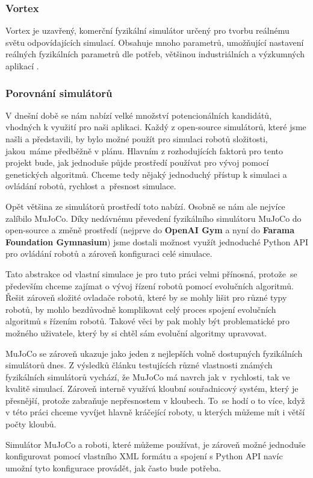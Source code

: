 \subsubsection{Vortex} \label{Vortex}
Vortex je uzavřený, komerční fyzikální simulátor určený pro tvorbu
reálnému světu odpovídajících simulací. Obsahuje mnoho parametrů,
umožňující nastavení reálných fyzikálních parametrů dle potřeb,
většinou industriálních a výzkumných aplikací \citep{coppeliarobotics}
\citep{yoon2023comparative}.

\subsubsection{Porovnání simulátorů} \label{Simulátory - Porovnání}
V dnešní době se nám nabízí velké množství potencionálních kandidátů, vhodných
k využití pro naši aplikaci. Každý z open-source simulátorů, které jsme našli a
představili, by bylo možné použít pro simulaci robotů složitosti, jakou~máme
předběžně v plánu. Hlavním z rozhodujících faktorů pro tento projekt bude, jak
jednoduše půjde prostředí používat pro vývoj pomocí genetických algoritmů.
Chceme tedy nějaký jednoduchý přístup k simulaci a ovládání robotů, rychlost
a~přesnost simulace. 

Opět většina ze simulátorů prostředí toto nabízí. Osobně se nám ale nejvíce
zalíbilo MuJoCo. Díky nedávnému převedení fyzikálního simulátoru MuJoCo do
open-source a změně prostředí (nejprve do \textbf{OpenAI Gym} a nyní do
\textbf{Farama Foundation Gymnasium}) jsme dostali možnost využít jednoduché
Python API pro ovládání robotů a zároveň konfiguraci celé simulace. 

Tato abstrakce od vlastní simulace je pro tuto práci velmi přínosná, protože~se
především chceme zajímat o vývoj řízení robotů pomocí evolučních algoritmů.
Řešit zároveň složité ovladače robotů, které by se mohly lišit pro různé typy
robotů, by mohlo bezdůvodně komplikovat celý proces spojení evolučních
algoritmů s řízením robotů. Takové věci by pak mohly být problematické pro
možného uživatele, který by si chtěl sám evoluční algoritmy upravovat.

MuJoCo se zároveň ukazuje jako jeden z nejlepších volně dostupných fyzikálních
simulátorů dnes. Z výsledků článku testujících různé vlastnosti známých fyzikálních
simulátorů \citet{erez2015simulation} vychází, že MuJoCo má navrch jak
v~rychlosti, tak ve kvalitě simulací. Zároveň interně využívá kloubní
souřadnicový systém, který je přesnější, protože zabraňuje nepřesnostem v
kloubech. To~se hodí o to více, když v této práci chceme vyvíjet hlavně
kráčející roboty, u kterých můžeme mít i větší počty kloubů. 

Simulátor MuJoCo a roboti, které můžeme používat, je zároveň možné
jednoduše konfigurovat pomocí vlastního XML formátu a spojení s Python API
navíc umožní tyto konfigurace provádět, jak často bude potřeba.
